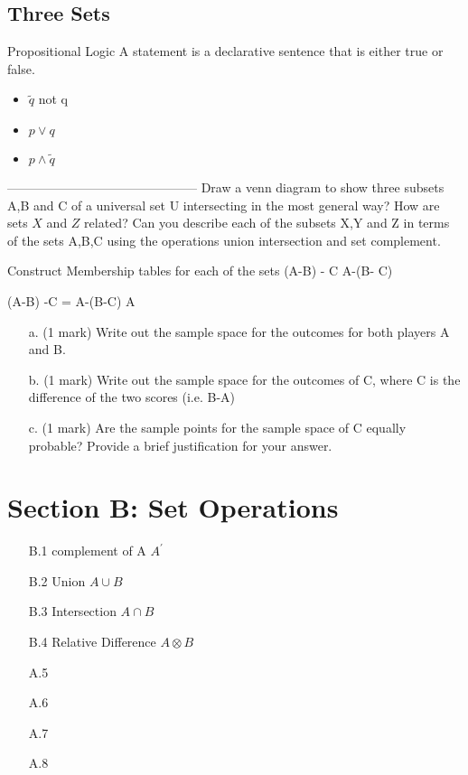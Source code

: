 \subsection*{ Three Sets }






Propositional Logic A statement is a declarative sentence that
is either true or false.
\begin{itemize}
\item $\tilde q$ not q \item $p \vee q$ \item $p \wedge \tilde
q$
\end{itemize}



---------------------------------------------
Draw a venn diagram to show three subsets A,B and C of a universal set U intersecting in
the most general way?
How are sets $X$ and $Z$ related?
Can you describe each of the subsets X,Y and Z in terms  of the
sets A,B,C using the operations union intersection and set complement.

Construct Membership tables for each of the sets
(A-B) - C
A-(B- C)

(A-B) -C = A-(B-C)
A



\begin{itemize}
\item[a.] (1 mark) Write out the sample space for the outcomes for both players A and B.
\item[b.] (1 mark) Write out the sample space for the outcomes of C, where C is the difference of the two scores (i.e. B-A)
\item[c.] (1 mark) Are the sample points for the sample space of C equally probable? Provide a brief justification for your answer.
\end{itemize}

\newpage
\section*{Section B: Set Operations}
\begin{itemize}
\item[B.1] complement of A $A^{\prime}$
\item[B.2] Union $A \cup B$
\item[B.3] Intersection $A \cap B$
\item[B.4] Relative Difference $A \otimes B$
\item[A.5]
\item[A.6]
\item[A.7]
\item[A.8]
\end{itemize}
\newpage



